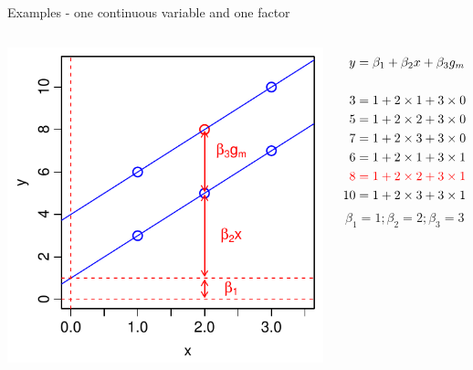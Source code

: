 \documentclass[xcolor=x11names,compress]{beamer}
\renewcommand{\(}{\begin{columns}}
\renewcommand{\)}{\end{columns}}
\newcommand{\<}[1]{\begin{column}{#1}}
\renewcommand{\>}{\end{column}}
\begin{document}
\begin{frame}{Examples - one continuous variable and one factor}

    \begin{columns}[T]
    
            \includegraphics[width=\textwidth]{TwoVarsHighlight.pdf}
            
                \begin{align*}
                  y  &= \beta_1  + \beta_2 x + \beta_3 g_m\\
                  \\
                  3   & = 1 + 2 \times 1 + 3 \times 0\\
                  5   & = 1 + 2 \times 2 + 3 \times 0\\
                  7   & = 1 + 2 \times 3 + 3 \times 0\\
                  6   & = 1 + 2 \times 1 + 3 \times 1\\  
                  {\color{red}8} & {\color{red}\;= 1 + 2 \times 2 + 3 \times 1}\\ %
                  10  & = 1 + 2 \times 3 + 3 \times 1
                \end{align*}
                \[\beta_1 = 1; \beta_2=2; \beta_3=3\]
    \end{columns}
    \end{frame}
    
\end{document}
